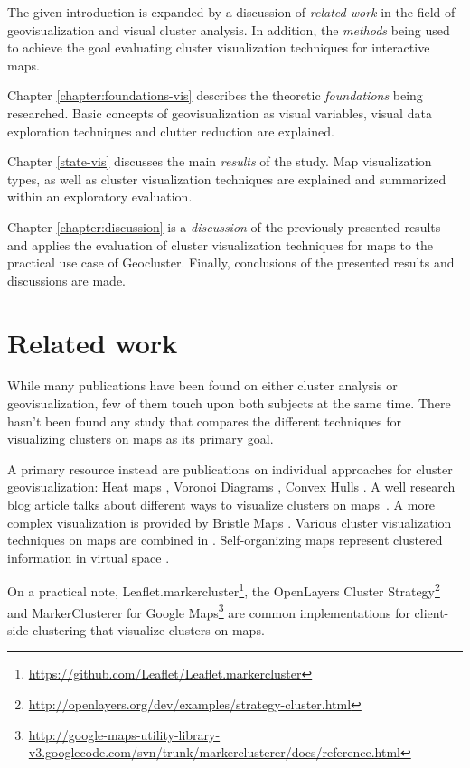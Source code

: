 The given introduction is expanded by a discussion of \textit{related work} in the field of geovisualization and visual cluster analysis. In addition, the \textit{methods} being used to achieve the goal evaluating cluster visualization techniques for interactive maps.

Chapter \ref{chapter:foundations-vis} describes the theoretic \textit{foundations} being researched. Basic concepts of geovisualization as visual variables, visual data exploration techniques and clutter reduction are explained.

Chapter \ref{state-vis} discusses the main \textit{results} of the study. Map visualization types, as well as cluster visualization techniques are explained and summarized within an exploratory evaluation.

Chapter \ref{chapter:discussion} is a \textit{discussion} of the previously presented results and applies the evaluation of cluster visualization techniques for maps to the practical use case of Geocluster. Finally, conclusions of the presented results and discussions are made.


\section{Related work}

While many publications have been found on either cluster analysis or geovisualization, few of them touch upon both subjects at the same time. There hasn't been found any study that compares the different techniques for visualizing clusters on maps as its primary goal.

A primary resource instead are publications on individual approaches for cluster geovisualization: 
Heat maps \cite{geotree, hotmap}, Voronoi Diagrams \cite{Delort10vis, voromap}, Convex Hulls \cite{Cristani08geoimagemaps}. A well research blog article talks about different ways to visualize clusters on maps~\cite{web:clustering-google}. A more complex visualization is provided by Bristle Maps \cite{bristle}. Various cluster visualization techniques on maps are combined in \cite{andrienko2012sca}. Self-organizing maps represent clustered information in virtual space \cite{som}.

On a practical note, Leaflet.markercluster\footnote{\url{https://github.com/Leaflet/Leaflet.markercluster}}, the OpenLayers Cluster Strategy\footnote{\url{http://openlayers.org/dev/examples/strategy-cluster.html}} and MarkerClusterer for Google Maps\footnote{\url{http://google-maps-utility-library-v3.googlecode.com/svn/trunk/markerclusterer/docs/reference.html}} are common implementations for client-side clustering that visualize clusters on maps.

